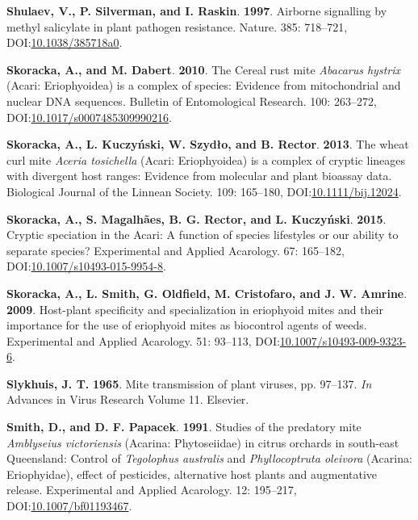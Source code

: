 \documentclass[12pt,final,CPage]{ufthesis}
\newlength{\cslhangindent}
\newenvironment{CSLReferences}[2] %
{%
	\setlength{\parindent}{0pt}
	\ifodd #1 \everypar{\setlength{\hangindent}{\cslhangindent}}\ignorespaces\fi
	\ifnum #2 > 0
	\setlength{\parskip}{#2\baselineskip}
	\fi
}%
{}
\begin{document}
{\begin{CSLReferences}{1}{0}
  \leavevmode{}%
  \textbf{Shulaev, V., P. Silverman, and I. Raskin}. \textbf{1997}. Airborne signalling by methyl salicylate in plant pathogen resistance. Nature. 385: 718--721, DOI:\href{https://doi.org/10.1038/385718a0}{10.1038/385718a0}.

  \leavevmode{}%
  \textbf{Skoracka, A., and M. Dabert}. \textbf{2010}. The {Cereal rust mite} {\emph{Abacarus hystrix}} ({Acari}: {Eriophyoidea}) is a complex of species: Evidence from mitochondrial and nuclear {DNA} sequences. Bulletin of Entomological Research. 100: 263--272, DOI:\href{https://doi.org/10.1017/s0007485309990216}{10.1017/s0007485309990216}.

  \leavevmode{}%
  \textbf{Skoracka, A., L. Kuczyński, W. Szydło, and B. Rector}. \textbf{2013}. The wheat curl mite {\emph{Aceria tosichella}} ({Acari: Eriophyoidea}) is a complex of cryptic lineages with divergent host ranges: Evidence from molecular and plant bioassay data. Biological Journal of the Linnean Society. 109: 165--180, DOI:\href{https://doi.org/10.1111/bij.12024}{10.1111/bij.12024}.

  \leavevmode{}%
  \textbf{Skoracka, A., S. Magalhães, B. G. Rector, and L. Kuczyński}. \textbf{2015}. Cryptic speciation in the {Acari}: A function of species lifestyles or our ability to separate species? Experimental and Applied Acarology. 67: 165--182, DOI:\href{https://doi.org/10.1007/s10493-015-9954-8}{10.1007/s10493-015-9954-8}.

  \leavevmode{}%
  \textbf{Skoracka, A., L. Smith, G. Oldfield, M. Cristofaro, and J. W. Amrine}. \textbf{2009}. Host-plant specificity and specialization in eriophyoid mites and their importance for the use of eriophyoid mites as biocontrol agents of weeds. Experimental and Applied Acarology. 51: 93--113, DOI:\href{https://doi.org/10.1007/s10493-009-9323-6}{10.1007/s10493-009-9323-6}.

  \leavevmode{}%
  \textbf{Slykhuis, J. T.} \textbf{1965}. Mite transmission of plant viruses, pp. 97--137. \emph{In} Advances in Virus Research Volume 11. Elsevier.

  \leavevmode{}%
  \textbf{Smith, D., and D. F. Papacek}. \textbf{1991}. Studies of the predatory mite {\emph{Amblyseius victoriensis}} ({{Acarina}: {Phytoseiidae}}) in citrus orchards in south-east {Queensland}: Control of {\emph{Tegolophus australis}} and {\emph{Phyllocoptruta oleivora}} ({{Acarina}: {Eriophyidae}}), effect of pesticides, alternative host plants and augmentative release. Experimental and Applied Acarology. 12: 195--217, DOI:\href{https://doi.org/10.1007/bf01193467}{10.1007/bf01193467}.


\end{CSLReferences}}
\end{document}
